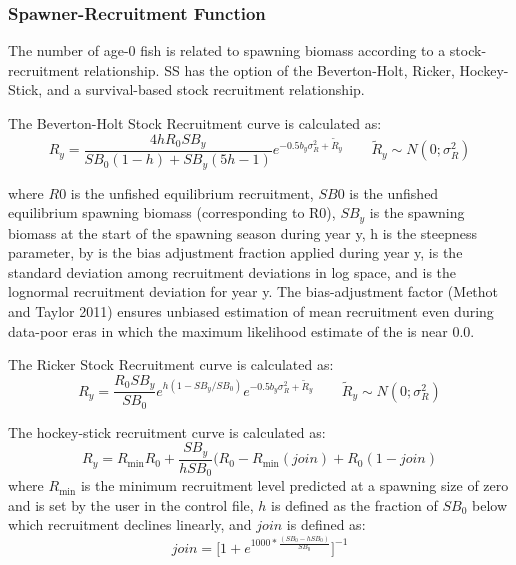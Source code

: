 \subsubsection{Spawner-Recruitment Function}
The number of age-0 fish is related to spawning biomass according to a stock-recruitment relationship.  SS has the option of the Beverton-Holt, Ricker, Hockey-Stick, and a survival-based stock recruitment relationship.

The Beverton-Holt Stock Recruitment curve is calculated as:
	\begin{equation}{R_y = \frac{4hR_0SB_y}{SB_0(1-h)+SB_y(5h-1)}e^{-0.5b_y\sigma^2_R+\tilde{R}_y}\qquad  \tilde{R}_y\sim N(0;\sigma^2_R)}
	\end{equation}
	
where $R0$ is the unfished equilibrium recruitment, $SB0$ is the unfished equilibrium spawning biomass (corresponding to R0), $SB_y$ is the spawning biomass at the start of the spawning season during year y, h is the steepness parameter, by is the bias adjustment fraction applied during year y,   is the standard deviation among recruitment deviations in log space, and   is the lognormal recruitment deviation for year y.  The bias-adjustment factor (Methot and Taylor 2011) ensures unbiased estimation of mean recruitment even during data-poor eras in which the maximum likelihood estimate of the   is near 0.0.

The Ricker Stock Recruitment curve is calculated as:
	\begin{equation}{R_y = \frac{R_0SB_y}{SB_0}e^{h(1-SB_y/SB_0)}e^{-0.5b_y\sigma^2_R+\tilde{R}_y}\qquad  \tilde{R}_y\sim N(0;\sigma^2_R)}
	\end{equation}
	
\hypertarget{Hockey}{}
The hockey-stick recruitment curve is calculated as:
	\begin{equation}{R_y = R_{\text{min}}R_0+\frac{SB_y}{hSB_0}(R_0-R_{\text{min}}(join)+R_0(1-join) }\end{equation}
where $R_{\text{min}}$ is the minimum recruitment level predicted at a spawning size of zero and is set by the user in the control file, $h$ is defined as the fraction of $SB_0$ below which recruitment declines linearly, and $join$ is defined as:
	\begin{equation}{ join = \bigg[1+e^{1000*\frac{(SB_0-hSB_0)}{SB_0}}\bigg]^{-1} } \end{equation}

